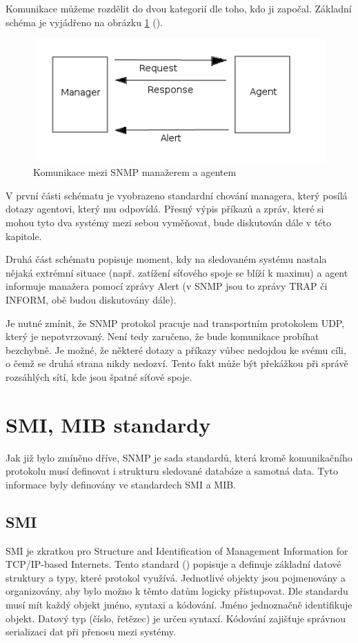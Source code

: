 Komunikace můžeme rozdělit do dvou kategorií dle toho, kdo ji započal. Základní schéma je vyjádřeno na obrázku \ref{obr_snmp2} (\cite{tcpip_snmp}).

\begin{figure}[htp]
	\begin{center}
		\includegraphics[width=12cm]{obrazky/02_snmp_communication.png}
		\caption{Komunikace mezi SNMP manažerem a agentem}
		\label{obr_snmp2}
	\end{center}
\end{figure}

V první části schématu je vyobrazeno standardní chování managera, který posílá dotazy agentovi, který mu odpovídá. Přesný výpis příkazů a zpráv, které si mohou tyto dva systémy mezi sebou vyměňovat, bude 
diskutován dále v této kapitole.

Druhá část schématu popisuje moment, kdy na sledovaném systému nastala nějaká extrémní situace (např. zatížení síťového spoje se blíží k maximu) a agent informuje manažera pomocí zprávy Alert (v SNMP jsou to zprávy
TRAP či INFORM, obě budou diskutovány dále).

Je nutné zmínit, že SNMP protokol pracuje nad transportním protokolem UDP, který je nepotvrzovaný. Není tedy zaručeno, že bude komunikace probíhat bezchybně. Je možné, že některé dotazy a příkazy vůbec nedojdou
ke svému cíli, o čemž se druhá strana nikdy nedozví. Tento fakt může být překážkou při správě rozsáhlých sítí, kde jsou špatné síťové spoje.


\section{SMI, MIB standardy}
Jak již bylo zmíněno dříve, SNMP je sada standardů, která kromě komunikačního protokolu musí definovat i strukturu sledované databáze a samotná data. Tyto informace byly definovány ve standardech SMI a MIB.

\subsection*{SMI}
SMI je zkratkou pro Structure and Identification of Management Information for TCP/IP-based Internets. Tento standard (\cite{rfc1155}) popisuje a definuje základní datové struktury a typy, které protokol využívá.
Jednotlivé objekty jsou pojmenovány a organizovány, aby bylo možno k těmto datům logicky přistupovat. Dle standardu musí mít každý objekt jméno, syntaxi a kódování. Jméno jednoznačně identifikuje objekt. Datový typ
(číslo, řetězec) je určen syntaxí. Kódování zajišťuje správnou serializaci dat při přenosu mezi systémy.


